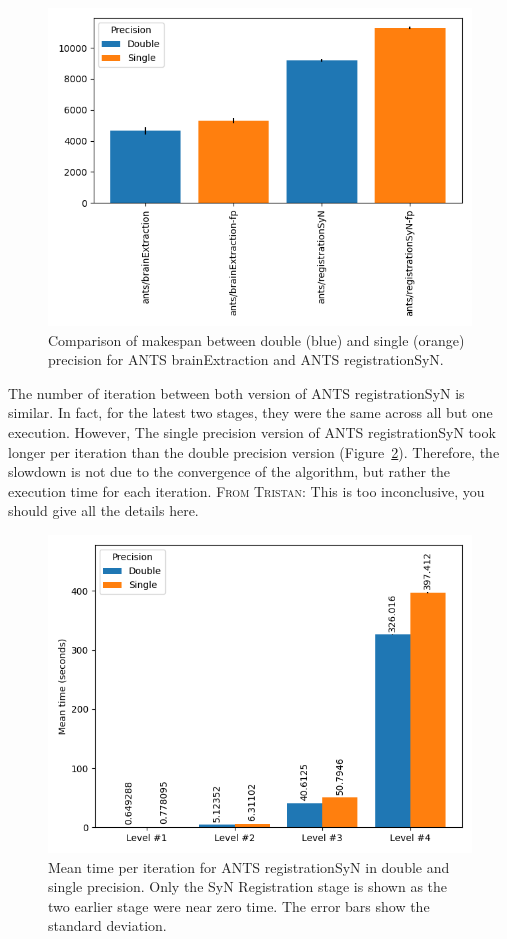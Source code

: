 \documentclass[conference]{IEEEtran}
\newcommand{\TG}[1]{\color{blue}\textsc{From Tristan: }#1\color{black}}
\begin{document}
\begin{figure}[ht]
	\includegraphics[width=\linewidth]{figures/makespan-ants.png}
	\caption{Comparison of makespan between double (blue) and single (orange) precision for ANTS brainExtraction and ANTS registrationSyN.}
	\label{fig:makespan-ants}
\end{figure}
			
The number of iteration between both version of ANTS registrationSyN is similar. In fact, for the latest two stages, they were the same across all but one execution. However, The single precision version of ANTS registrationSyN took longer per iteration than the double precision version (Figure~\ref{fig:mean-time-per-iteration-ants}). Therefore, the slowdown is not due to the convergence of the algorithm, but rather the execution time for each iteration. \TG{This is too inconclusive, you should give all the details here.}

\begin{figure}
	\includegraphics[width=\linewidth]{figures/ants-registrationSyN-iteration-mean.png}
	\caption{Mean time per iteration for ANTS registrationSyN in double and single precision. Only the SyN Registration stage is shown as the two earlier stage were near zero time. The error bars show the standard deviation.}
	\label{fig:mean-time-per-iteration-ants}
\end{figure}
						
\end{document}
